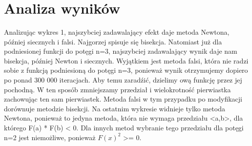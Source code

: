 \documentclass{article}
\begin{document}
\section{Analiza wyników}
\paragraph{}
Analizując wykres 1, najszybciej zadawalający efekt daje metoda Newtona, później siecznych i falsi. Najgorzej spisuje się bisekcja.
Natomiast już dla podniesionej funkcji do potęgi n=3, najszybciej zadawalający wynik daje nam bisekcja, później Newton i siecznych.
Wyjątkiem jest metoda falsi, która nie radzi sobie z funkcją podniesioną do potęgi n=3, ponieważ wynik otrzymujemy dopiero po ponad 300 000 iteracjach. Aby temu zaradźić, dzielimy ową funkcję przez jej pochodną. W ten sposób zmniejszamy przedział i wielokrotność pierwiastka zachowując ten sam pierwiastek. Metoda falsi w tym przypadku po modyfikacji dorównuje metodzie bisekcji. Na ostatnim wykresie widnieje tylko metoda Newtona, ponieważ to jedyna metoda, która nie wymaga przedziału <a,b>, dla którego F(a)  *  F(b) < 0. Dla innych metod wybranie tego przedziału dla potęgi n=2 jest niemożliwe, ponieważ \(F(x)^2\) >= 0.



\vfill {}
\end{document}
